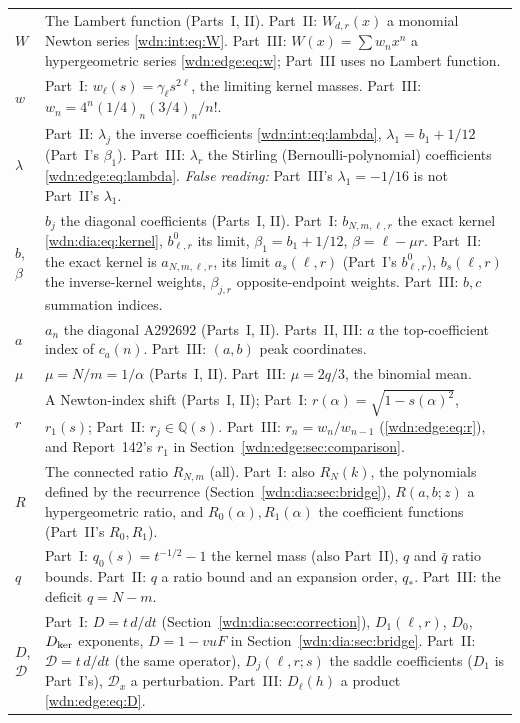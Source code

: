\documentclass[11pt,letterpaper]{article}
\theoremstyle{remark}\newtheorem{remark}[theorem]{Remark}
\newcommand{\Q}{\mathbb Q}
\newcommand{\dd}{\mathcal D}
\begin{document}
\begin{longtable}{@{}>{\raggedright\arraybackslash}p{} >{\raggedright\arraybackslash}p{}@{}}
$W$ & The Lambert function (Parts~I, II). Part~II: $W_{d,r}(x)$ a monomial Newton series \eqref{wdn:int:eq:W}. Part~III: $W(x)=\sum w_nx^n$ a hypergeometric series \eqref{wdn:edge:eq:w}; Part~III uses no Lambert function.\\
$w$ & Part~I: $w_\ell(s)=\gamma_\ell s^{2\ell}$, the limiting kernel masses. Part~III: $w_n=4^n(1/4)_n(3/4)_n/n!$.\\
$\lambda$ & Part~II: $\lambda_j$ the inverse coefficients \eqref{wdn:int:eq:lambda}, $\lambda_1=b_1+1/12$ (Part~I's $\beta_1$). Part~III: $\lambda_r$ the Stirling (Bernoulli-polynomial) coefficients \eqref{wdn:edge:eq:lambda}. \emph{False reading:} Part~III's $\lambda_1=-1/16$ is not Part~II's $\lambda_1$.\\
$b$, $\beta$ & $b_j$ the diagonal coefficients (Parts~I, II). Part~I: $b_{N,m,\ell,r}$ the exact kernel \eqref{wdn:dia:eq:kernel}, $b^0_{\ell,r}$ its limit, $\beta_1=b_1+1/12$, $\beta=\ell-\mu r$. Part~II: the exact kernel is $a_{N,m,\ell,r}$, its limit $a_s(\ell,r)$ (Part~I's $b^0_{\ell,r}$), $b_s(\ell,r)$ the inverse-kernel weights, $\beta_{j,r}$ opposite-endpoint weights. Part~III: $b,c$ summation indices.\\
$a$ & $a_n$ the diagonal A292692 (Parts~I, II). Parts~II, III: $a$ the top-coefficient index of $c_a(n)$. Part~III: $(a,b)$ peak coordinates.\\
$\mu$ & $\mu=N/m=1/\alpha$ (Parts~I, II). Part~III: $\mu=2q/3$, the binomial mean.\\
$r$ & A Newton-index shift (Parts~I, II); Part~I: $r(\alpha)=\sqrt{1-s(\alpha)^2}$, $r_1(s)$; Part~II: $r_j\in\Q(s)$. Part~III: $r_n=w_n/w_{n-1}$ (\eqref{wdn:edge:eq:r}), and Report~142's $r_1$ in Section~\ref{wdn:edge:sec:comparison}.\\
$R$ & The connected ratio $R_{N,m}$ (all). Part~I: also $R_N(k)$, the polynomials defined by the recurrence (Section~\ref{wdn:dia:sec:bridge}), $R(a,b;z)$ a hypergeometric ratio, and $R_0(\alpha),R_1(\alpha)$ the coefficient functions (Part~II's $R_0,R_1$).\\
$q$ & Part~I: $q_0(s)=t^{-1/2}-1$ the kernel mass (also Part~II), $q$ and $\bar q$ ratio bounds. Part~II: $q$ a ratio bound and an expansion order, $q_*$. Part~III: the deficit $q=N-m$.\\
$D$, $\mathcal D$ & Part~I: $D=t\,d/dt$ (Section~\ref{wdn:dia:sec:correction}), $D_1(\ell,r)$, $D_0$, $D_{\rm ker}$ exponents, $D=1-vuF$ in Section~\ref{wdn:dia:sec:bridge}. Part~II: $\dd=t\,d/dt$ (the same operator), $D_j(\ell,r;s)$ the saddle coefficients ($D_1$ is Part~I's), $\mathcal D_x$ a perturbation. Part~III: $D_\ell(h)$ a product \eqref{wdn:edge:eq:D}.\\

\end{longtable}
\end{document}
